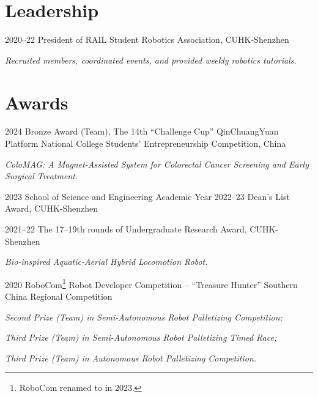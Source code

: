 \documentclass[11pt,letterpaper]{report}
\begin{document}
	
\section*{Leadership}
\begin{tablist}
	\item[2020--22]   \tab President of RAIL Student Robotics Association, CUHK-Shenzhen 
	
	\textit{Recruited members, coordinated events, and provided weekly robotics tutorials.}
\end{tablist}
	
\section*{Awards}
\begin{tablist}	
%	
%	
	
	\item[2024] \tab Bronze Award (Team), The 14th ``Challenge Cup'' QinChuangYuan Platform National College Students' Entrepreneurship Competition, China

	\textit{ColoMAG: A Magnet-Assisted System for Colorectal Cancer Screening and Early Surgical Treatment.}	

	\item[2023]   \tab School of Science and Engineering Academic Year 2022--23 Dean's List Award, CUHK-Shenzhen
	\item[2021--22]   \tab The 17--19th rounds of  Undergraduate Research Award, CUHK-Shenzhen
	
	\textit{Bio-inspired Aquatic-Aerial Hybrid Locomotion Robot.}
	
	\item[2020] \tab RoboCom\footnote{RoboCom renamed to  in 2023.} Robot Developer Competition -- ``Treasure Hunter'' Southern China Regional Competition
	
	\textit{Second Prize (Team) in Semi-Autonomous Robot Palletizing Competition;}
	
	\textit{Third Prize (Team) in Semi-Autonomous Robot Palletizing Timed Race;}
	
	\textit{Third Prize (Team) in Autonomous Robot Palletizing Competition.}
\end{tablist}
	
\end{document}
